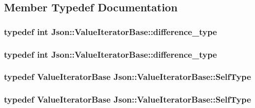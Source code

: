\subsection{Member Typedef Documentation}
\hypertarget{classJson_1_1ValueIteratorBase_a4e44bf8cbd17ec8d6e2c185904a15ebd}{
\subsubsection[{difference\-\_\-type}]{\setlength{\rightskip}{0pt plus 5cm}typedef int {\bf Json\-::\-Value\-Iterator\-Base\-::difference\-\_\-type}}}\label{dc/d8a/classJson_1_1ValueIteratorBase_a4e44bf8cbd17ec8d6e2c185904a15ebd}
\hypertarget{classJson_1_1ValueIteratorBase_a4e44bf8cbd17ec8d6e2c185904a15ebd}{
\subsubsection[{difference\-\_\-type}]{\setlength{\rightskip}{0pt plus 5cm}typedef int {\bf Json\-::\-Value\-Iterator\-Base\-::difference\-\_\-type}}}\label{dc/d8a/classJson_1_1ValueIteratorBase_a4e44bf8cbd17ec8d6e2c185904a15ebd}
\hypertarget{classJson_1_1ValueIteratorBase_a9d2a940d03ea06d20d972f41a89149ee}{
\subsubsection[{Self\-Type}]{\setlength{\rightskip}{0pt plus 5cm}typedef {\bf Value\-Iterator\-Base} {\bf Json\-::\-Value\-Iterator\-Base\-::\-Self\-Type}}}\label{dc/d8a/classJson_1_1ValueIteratorBase_a9d2a940d03ea06d20d972f41a89149ee}
\hypertarget{classJson_1_1ValueIteratorBase_a9d2a940d03ea06d20d972f41a89149ee}{
\subsubsection[{Self\-Type}]{\setlength{\rightskip}{0pt plus 5cm}typedef {\bf Value\-Iterator\-Base} {\bf Json\-::\-Value\-Iterator\-Base\-::\-Self\-Type}}}\label{dc/d8a/classJson_1_1ValueIteratorBase_a9d2a940d03ea06d20d972f41a89149ee}
